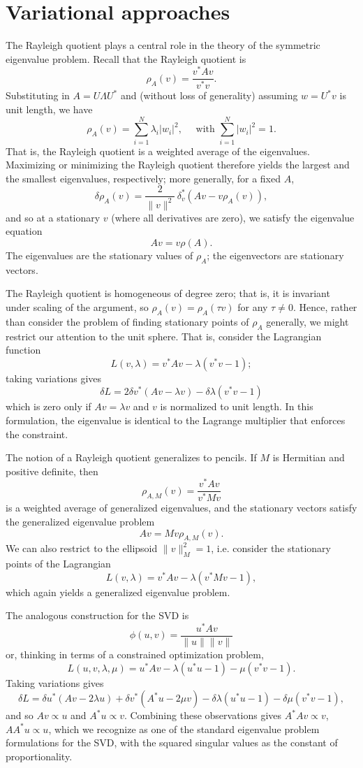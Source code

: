 \documentclass[12pt, leqno]{article} %
\begin{document}
\section{Variational approaches}


The Rayleigh quotient plays a central role in the theory of the
symmetric eigenvalue problem.  Recall that the Rayleigh quotient is
\[
  \rho_A(v) = \frac{v^* A v}{v^* v}.
\]
Substituting in $A = U \Lambda U^*$ and (without loss of generality)
assuming $w = U^* v$ is unit length, we have
\[
  \rho_A(v) = \sum_{i=1}^N \lambda_i |w_i|^2, \quad
  \mbox{ with } \sum_{i=1}^N |w_i|^2 = 1.
\]
That is, the Rayleigh quotient is a weighted average of the eigenvalues.
Maximizing or minimizing the Rayleigh quotient therefore yields the
largest and the smallest eigenvalues, respectively; more generally,
for a fixed $A$,
\[
  \delta \rho_A(v) = \frac{2}{\|v\|^2} \, \delta_v^* \left( A v - v \rho_A(v) \right),
\]
and so at a stationary $v$ (where all derivatives are zero),
we satisfy the eigenvalue equation
\[
  Av = v \rho(A).
\]
The eigenvalues are the stationary values of $\rho_A$; the eigenvectors
are stationary vectors.

The Rayleigh quotient is homogeneous of degree zero; that is, it is
invariant under scaling of the argument, so $\rho_A(v) = \rho_A(\tau v)$
for any $\tau \neq 0$.  Hence, rather than consider the problem of
finding stationary points of $\rho_A$ generally, we might restrict our
attention to the unit sphere.  That is, consider the Lagrangian function
\[
  L(v,\lambda) = v^* A v - \lambda (v^* v - 1);
\]
taking variations gives
\[
  \delta L = 2 \delta v^* (Av -\lambda v) - \delta \lambda (v^* v - 1)
\]
which is zero only if $Av = \lambda v$ and $v$ is normalized to unit
length.  In this formulation, the eigenvalue is identical to the
Lagrange multiplier that enforces the constraint.

The notion of a Rayleigh quotient generalizes to pencils.
If $M$ is Hermitian and positive definite, then
\[
  \rho_{A,M}(v) = \frac{v^* A v}{v^* M v}
\]
is a weighted average of generalized eigenvalues, and the stationary
vectors satisfy the generalized eigenvalue problem
\[
  Av = Mv \rho_{A,M}(v).
\]
We can also restrict to the ellipsoid $\|v\|_M^2 = 1$, i.e. consider
the stationary points of the Lagrangian
\[
  L(v,\lambda) = v^* A v - \lambda (v^* M v - 1),
\]
which again yields a generalized eigenvalue problem.

The analogous construction for the SVD is
\[
  \phi(u,v) = \frac{u^* A v}{\|u\| \|v\|}
\]
or, thinking in terms of a constrained optimization problem, 
\[
  L(u,v,\lambda,\mu) = u^* A v - \lambda (u^* u - 1) - \mu (v^* v-1).
\]
Taking variations gives
\[
  \delta L =
  \delta u^* (Av - 2\lambda u) + \delta v^* (A^* u-2\mu v) - \delta \lambda (u^*u - 1) - \delta \mu (v^* v - 1),
\]
and so $Av \propto u$ and $A^* u \propto v$.  Combining these observations
gives $A^* A v \propto v$, $A A^* u \propto u$, which we recognize as one
of the standard eigenvalue problem formulations for the SVD, with the squared
singular values as the constant of proportionality.
\end{document}
